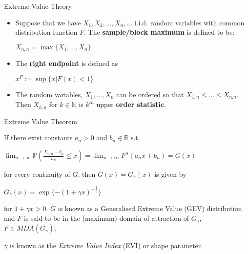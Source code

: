 \documentclass{beamer}
\begin{document}
\begin{frame}{Extreme Value Theory}
\begin{itemize}
\item Suppose that we have $X_1, X_2, ... , X_n, ... $ i.i.d. random variables with common distribution function $F$. The \textbf{sample/block maximum} is defined to be:

\begin{center} $ X_{n,n} = \max\{X_1, ... , X_n\}$ \end{center}

\item The \textbf{right endpoint} is defined as

\begin{center} $x^F := \sup\{x | F(x) < 1\}$ \end{center}

\item The random variables, $X_1, ... , X_n$ can be ordered so that $X_{1,n} \le ... \le X_{n.n}$. Then $X_{k,n} $ for $k \in \mathbb{N}$ is $k^{th}$ upper \textbf{order statistic}.

\end{itemize}
\end{frame}

\begin{frame}{Extreme Value Theorem}

If there exist constants $a_n >0$ and $b_n \in \mathbb{R}$ s.t. \newline

\begin{center}$\displaystyle \lim_{n \rightarrow \infty} \mathbb{P}\left(\frac{X_{n,n} - b_n}{a_n} \le x\right) =  \lim_{n \rightarrow \infty} F^n (a_n x + b_n) = G(x)$ \end{center}

for every continuity of $G$, then $G(x) = G_\gamma(x)$ is given by

\begin{center} $G_\gamma(x) = \exp\{-(1+\gamma x)^{-\frac{1}{\gamma}}\} $ \end{center}

for $1 + \gamma x >0$. $G$ is known as a Generalised Extreme Value (GEV) distribution and $F$ is said to be in the (maximum) domain of attraction of $G_\gamma$, $F \in MDA(G_\gamma)$. \newline


$\gamma$ is known as the \textit{Extreme Value Index} (EVI) or shape parameter.

\end{frame}
\end{document}
